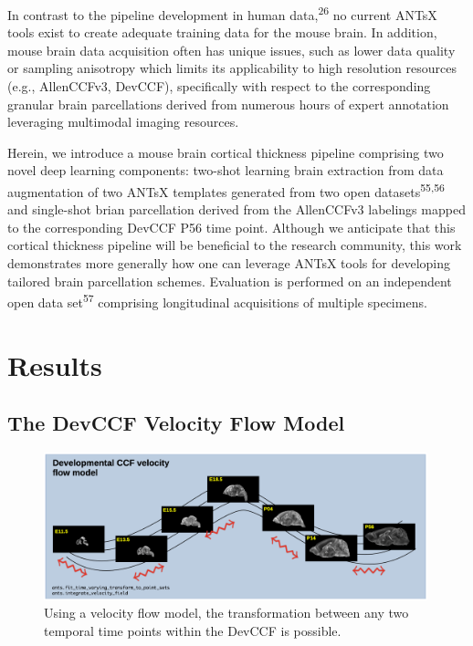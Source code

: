 \documentclass[
  12pt,
]{article}
\begin{document}
In contrast to the pipeline development in human
data,\textsuperscript{26} no current ANTsX tools exist to create
adequate training data for the mouse brain. In addition, mouse brain
data acquisition often has unique issues, such as lower data quality or
sampling anisotropy which limits its applicability to high resolution
resources (e.g., AllenCCFv3, DevCCF), specifically with respect to the
corresponding granular brain parcellations derived from numerous hours
of expert annotation leveraging multimodal imaging resources.

Herein, we introduce a mouse brain cortical thickness pipeline
comprising two novel deep learning components: two-shot learning brain
extraction from data augmentation of two ANTsX templates generated from
two open datasets\textsuperscript{55,56} and single-shot brian
parcellation derived from the AllenCCFv3 labelings mapped to the
corresponding DevCCF P56 time point. Although we anticipate that this
cortical thickness pipeline will be beneficial to the research
community, this work demonstrates more generally how one can leverage
ANTsX tools for developing tailored brain parcellation schemes.
Evaluation is performed on an independent open data
set\textsuperscript{57} comprising longitudinal acquisitions of multiple
specimens.

\clearpage
\newpage

\hypertarget{results}{%
\section{Results}\label{results}}

\hypertarget{the-devccf-velocity-flow-model-1}{%
\subsection{The DevCCF Velocity Flow
Model}\label{the-devccf-velocity-flow-model-1}}

\begin{figure}
\centering
\includegraphics[width=0.99\textwidth]{Figures/lowerLeftPanel.png}
\caption{Using a velocity flow model, the transformation between any two
temporal time points within the DevCCF is possible.}
\label{fig:devccfvelocity}
\end{figure}
\end{document}
